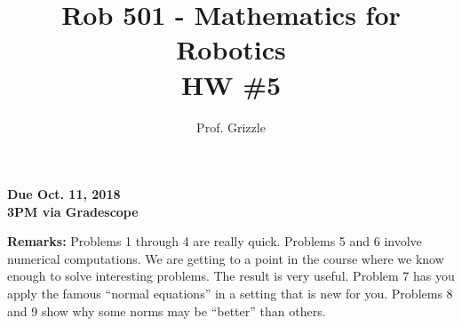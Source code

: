 \documentclass[letterpaper]{article}
\author{Prof. Grizzle}
\title{Rob 501 - Mathematics for Robotics\\
HW \#5}
\begin{document}
\date{}
\maketitle


 \newcommand{\trace}{\mathrm{trace}}
\newcommand{\real}{\mathbb R}  %
\newcommand{\nat}{\mathbb N}   %
\newcommand{\cp}{\mathbb C}    %
\newcommand{\ds}{\displaystyle}
\newcommand{\mf}[2]{\frac{\ds #1}{\ds #2}}
\newcommand{\Nagy}[2]{{Nagy, Page~#1, }{Prob.~#2}}
\newcommand{\spanof}[1]{\textrm{span} \{ #1 \}}
\newcommand{\argmin}{\arg\!\min}
\parindent 0pt


\begin{flushright}
{\bfseries Due Oct. 11, 2018} \\
{\bfseries 3PM via Gradescope} \\[3mm]
\end{flushright}

\noindent \textbf{Remarks:}  Problems 1 through 4 are really quick. Problems 5 and 6 involve numerical computations.  We are getting to a point in the course where we know enough to solve interesting problems. The result is very useful. Problem 7 has you apply the famous ``normal equations'' in a setting that is new for you. Problems 8 and 9 show why some norms may be ``better'' than others.
\end{document}
